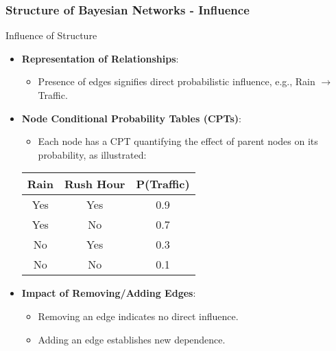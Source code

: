 \documentclass[aspectratio=169]{beamer}
\begin{document}
\begin{frame}[fragile]
    \frametitle{Structure of Bayesian Networks - Influence}
    \begin{block}{Influence of Structure}
        \begin{itemize}
            \item \textbf{Representation of Relationships}:
                \begin{itemize}
                    \item Presence of edges signifies direct probabilistic influence, e.g., Rain $\rightarrow$ Traffic.
                \end{itemize}
            \item \textbf{Node Conditional Probability Tables (CPTs)}:
                \begin{itemize}
                    \item Each node has a CPT quantifying the effect of parent nodes on its probability, as illustrated:
                \end{itemize}
                \begin{center}
                    \begin{tabular}{|c|c|c|}
                        \hline
                        Rain & Rush Hour & P(Traffic) \\
                        \hline
                        Yes  & Yes       & 0.9 \\
                        Yes  & No        & 0.7 \\
                        No   & Yes       & 0.3 \\
                        No   & No        & 0.1 \\
                        \hline
                    \end{tabular}
                \end{center}
            \item \textbf{Impact of Removing/Adding Edges}:
                \begin{itemize}
                    \item Removing an edge indicates no direct influence.
                    \item Adding an edge establishes new dependence.
                \end{itemize}
        \end{itemize}
    \end{block}
\end{frame}
\end{document}
